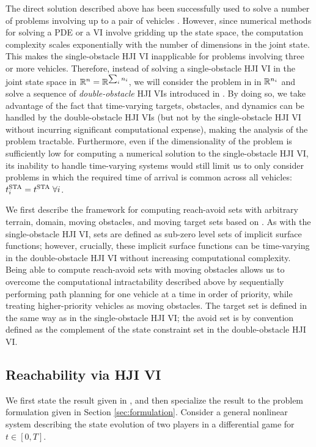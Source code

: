 The direct solution described above has been successfully used to solve a number of problems involving up to a pair of vehicles \cite{mitchell05, ding08, huang11, chen14}. However, since numerical methods for solving a PDE or a VI involve gridding up the state space, the computation complexity scales exponentially with the number of dimensions in the joint state. This makes the single-obstacle HJI VI inapplicable for problems involving three or more vehicles. Therefore, instead of solving a single-obstacle HJI VI in the joint state space in $\mathbb{R}^n=\mathbb{R}^{\sum_i n_i}$, we will consider the problem in in $\mathbb{R}^{n_i}$ and solve a sequence of \textit{double-obstacle} HJI VIs introduced in \cite{fisac15}. By doing so, we take advantage of the fact that time-varying targets, obstacles, and dynamics can be handled by the double-obstacle HJI VIs (but not by the single-obstacle HJI VI without incurring significant computational expense), making the analysis of the problem tractable. Furthermore, even if the dimensionality of the problem is sufficiently low for computing a numerical solution to the single-obstacle HJI VI, its inability to handle time-varying systems would still limit us to only consider problems in which the required time of arrival is common across all vehicles: $t^{\text{STA}}_i = t^{\text{STA}} \;\forall i$.

We first describe the framework for computing reach-avoid sets with arbitrary terrain, domain, moving obstacles, and moving target sets based on \cite{fisac15}. As with the single-obstacle HJI VI, sets are defined as sub-zero level sets of implicit surface functions; however, crucially, these implicit surface functions can be time-varying in the double-obstacle HJI VI without increasing computational complexity. Being able to compute reach-avoid sets with moving obstacles allows us to overcome the computational intractability described above by sequentially performing path planning for one vehicle at a time in order of priority, while treating higher-priority vehicles as moving obstacles. The target set is defined in the same way as in the single-obstacle HJI VI; the avoid set is by convention defined as the complement of the state constraint set in the double-obstacle HJI VI.

\subsection{Reachability via HJI VI}
We first state the result given in \cite{fisac15}, and then specialize the result to the problem formulation given in Section \ref{sec:formulation}. Consider a general nonlinear system describing the state evolution of two players in a differential game for $t\in[0,T]$.

